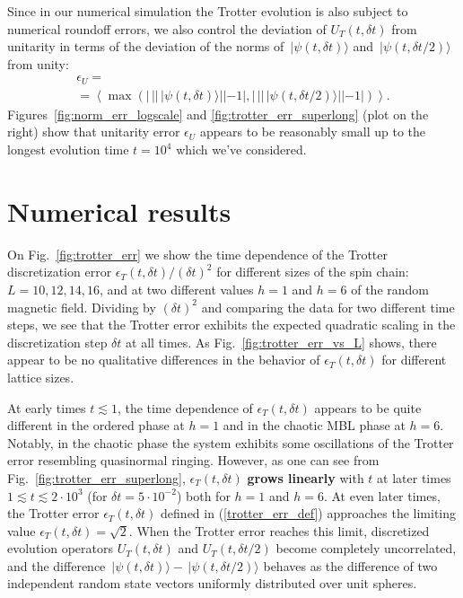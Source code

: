 \documentclass[10pt,amsmath,amssymb,twocolumn,superscriptaddress,groupedaddress,nofootinbib,aps,prd,twocolumn]{revtex4-1}
\newcommand{\lr}[1]{\left(#1\right)}
\newcommand{\vev}[1]{\left\langle #1 \right\rangle}
\newcommand{\ket}[1]{ \, | #1 \rangle }
\begin{document}
Since in our numerical simulation the Trotter evolution is also subject to numerical roundoff errors, we also control the deviation of $U_T\lr{t, {\delta t}}$ from unitarity in terms of the deviation of the norms of $\ket{\psi\lr{t, {\delta t}}}$ and $\ket{\psi\lr{t, {\delta t}/2}}$ from unity:
\begin{eqnarray}
\label{norm_err_def}
 \epsilon_U =
 \nonumber \\ =
  \vev{ \max\lr{
  \left| \, ||\ket{\psi\lr{t, {\delta t}}}|| - 1 \right|, 
  \left| \, ||\ket{\psi\lr{t, {\delta t}/2}}|| - 1 \right|
 } } .
\end{eqnarray}
Figures~\ref{fig:norm_err_logscale} and \ref{fig:trotter_err_superlong} (plot on the right) show that unitarity error $\epsilon_U$ appears to be reasonably small up to the longest evolution time $t = 10^4$ which we've considered.

\section{Numerical results}
\label{sec:numres}

On Fig.~\ref{fig:trotter_err} we show the time dependence of the Trotter discretization error $\epsilon_T\lr{t, {\delta t}}/\lr{\delta t}^2$ for different sizes of the spin chain: $L = 10, 12, 14, 16$, and at two different values $h = 1$ and $h = 6$ of the random magnetic field. Dividing by $\lr{\delta t}^2$ and comparing the data for two different time steps, we see that the Trotter error exhibits the expected quadratic scaling in the discretization step $\delta t$ at all times. As Fig.~\ref{fig:trotter_err_vs_L} shows, there appear to be no qualitative differences in the behavior of $\epsilon_T\lr{t, \delta t}$ for different lattice sizes.

At early times $t \lesssim 1$, the time dependence of $\epsilon_T\lr{t, \delta t}$ appears to be quite different in the ordered phase at $h = 1$ and in the chaotic MBL phase at $h = 6$. Notably, in the chaotic phase the system exhibits some oscillations of the Trotter error resembling quasinormal ringing. However, as one can see from Fig.~\ref{fig:trotter_err_superlong}, $\epsilon_T\lr{t, \delta t}$ \textbf{grows linearly} with $t$ at later times $ 1 \lesssim t \lesssim 2 \cdot 10^3$ (for ${\delta t} = 5 \cdot 10^{-2}$) both for $h=1$ and $h=6$. At even later times, the Trotter error $\epsilon_T\lr{t, \delta t}$ defined in (\ref{trotter_err_def}) approaches the limiting value $\epsilon_T\lr{t, \delta t} = \sqrt{2}$. When the Trotter error reaches this limit, discretized evolution operators $U_T\lr{t, {\delta t}}$ and $U_T\lr{t, {\delta t}/2}$ become completely uncorrelated, and the difference $\ket{\psi\lr{t, {\delta t}}} - \ket{\psi\lr{t, {\delta t}/2}}$ behaves as the difference of two independent random state vectors uniformly distributed over unit spheres.
\end{document}
